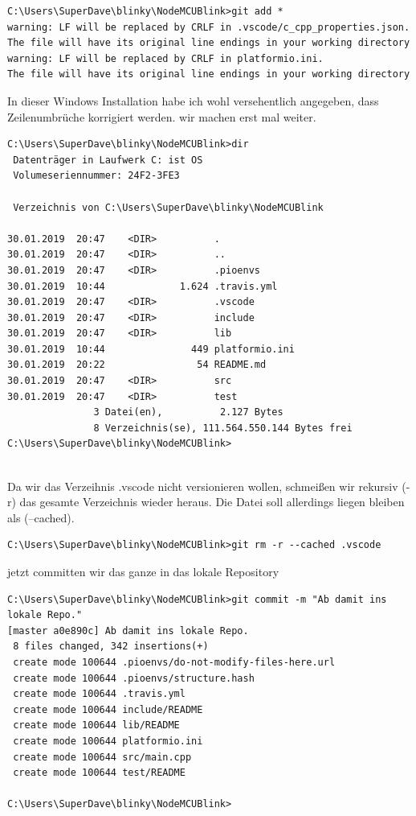 \begin{verbatim}
C:\Users\SuperDave\blinky\NodeMCUBlink>git add *
warning: LF will be replaced by CRLF in .vscode/c_cpp_properties.json.
The file will have its original line endings in your working directory
warning: LF will be replaced by CRLF in platformio.ini.
The file will have its original line endings in your working directory
\end{verbatim}
In dieser Windows Installation habe ich wohl versehentlich angegeben, dass Zeilenumbrüche korrigiert werden. wir machen erst mal weiter.\\
\begin{verbatim}
C:\Users\SuperDave\blinky\NodeMCUBlink>dir
 Datenträger in Laufwerk C: ist OS
 Volumeseriennummer: 24F2-3FE3

 Verzeichnis von C:\Users\SuperDave\blinky\NodeMCUBlink

30.01.2019  20:47    <DIR>          .
30.01.2019  20:47    <DIR>          ..
30.01.2019  20:47    <DIR>          .pioenvs
30.01.2019  10:44             1.624 .travis.yml
30.01.2019  20:47    <DIR>          .vscode
30.01.2019  20:47    <DIR>          include
30.01.2019  20:47    <DIR>          lib
30.01.2019  10:44               449 platformio.ini
30.01.2019  20:22                54 README.md
30.01.2019  20:47    <DIR>          src
30.01.2019  20:47    <DIR>          test
               3 Datei(en),          2.127 Bytes
               8 Verzeichnis(se), 111.564.550.144 Bytes frei
C:\Users\SuperDave\blinky\NodeMCUBlink>
               
\end{verbatim}
Da wir das Verzeihnis .vscode nicht versionieren wollen, schmeißen wir rekursiv (-r) das gesamte Verzeichnis wieder heraus. Die Datei soll allerdings liegen bleiben als (--cached).\\
\begin{verbatim}
C:\Users\SuperDave\blinky\NodeMCUBlink>git rm -r --cached .vscode
\end{verbatim}
jetzt committen wir das ganze in das lokale Repository\\
\begin{verbatim}
C:\Users\SuperDave\blinky\NodeMCUBlink>git commit -m "Ab damit ins lokale Repo."
[master a0e890c] Ab damit ins lokale Repo.
 8 files changed, 342 insertions(+)
 create mode 100644 .pioenvs/do-not-modify-files-here.url
 create mode 100644 .pioenvs/structure.hash
 create mode 100644 .travis.yml
 create mode 100644 include/README
 create mode 100644 lib/README
 create mode 100644 platformio.ini
 create mode 100644 src/main.cpp
 create mode 100644 test/README

C:\Users\SuperDave\blinky\NodeMCUBlink>

\end{verbatim}
